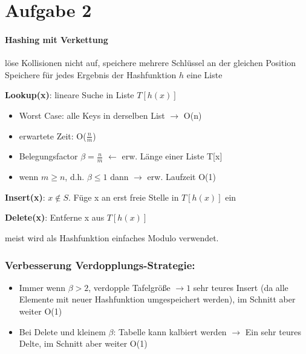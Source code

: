 \documentclass[10pt,a4paper]{article}
\begin{document}

\section*{Aufgabe 2}
\paragraph{Hashing mit Verkettung} löse Kollisionen nicht auf, speichere mehrere Schlüssel an der gleichen Position
\\

Speichere für jedes Ergebnis der Hashfunktion $h$ eine Liste

\textbf{Lookup(x)}: lineare Suche in Liste $T[h(x)]$ \\ 
\begin{itemize}
    \item Worst Case: alle Keys in derselben List $\rightarrow$ O(n)
    \item erwartete Zeit: O($\frac{n}{m}$)
    \item Belegungsfactor $\beta = \frac{n}{m}$ $\leftarrow$ erw. Länge einer Liste T[x]
    \item wenn $m \geq n$, d.h. $\beta \leq 1$ dann $\rightarrow$ erw. Laufzeit O(1)
\end{itemize}
        

\textbf{Insert(x)}: $x\notin S.$ Füge x an erst freie Stelle in $T[h(x)]$ ein

\textbf{Delete(x)}: Entferne x aus $T[h(x)]$

\begin{center}
	\resizebox{.6\columnwidth}{!}{
		
	}
\end{center}
meist wird als Hashfunktion einfaches Modulo verwendet.

\subsubsection*{Verbesserung Verdopplungs-Strategie:}
\begin{itemize}
    \item Immer wenn $\beta>2$, verdopple Tafelgröße $\rightarrow1$ sehr teures Insert (da alle Elemente mit neuer Hashfunktion umgespeichert werden), im Schnitt aber weiter O(1)\\ 
    \item Bei Delete und kleinem $\beta$: Tabelle kann kalbiert werden $\rightarrow$ Ein sehr teures Delte, im Schnitt aber weiter O(1)
\end{itemize}
\end{document}
